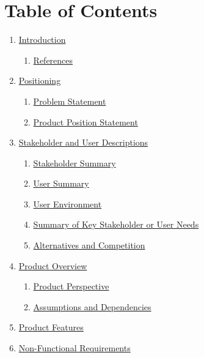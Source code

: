 \documentclass[12pt]{article}
\begin{document}
\section*{Table of Contents}
\par\medskip
\begin{enumerate}
\item \hyperlink{sec:1-introduction}{Introduction}
\par
\begin{enumerate}
\item \hyperlink{sec:11-references}{References}
\par
\end{enumerate}
\item \hyperlink{sec:2-positioning}{Positioning}
\par
\begin{enumerate}
\item \hyperlink{sec:21-problem-statement}{Problem Statement}
\par
\item \hyperlink{sec:22-product-position-statement}{Product Position Statement}
\par
\end{enumerate}
\item \hyperlink{sec:3-stakeholder-and-user-descriptions}{Stakeholder and User Descriptions}
\par
\begin{enumerate}
\item \hyperlink{sec:31-stakeholder-summary}{Stakeholder Summary}
\par
\item \hyperlink{sec:32-user-summary}{User Summary}
\par
\item \hyperlink{sec:33-user-environment}{User Environment}
\par
\item \hyperlink{sec:34-summary-of-key-stakeholder-or-user-needs}{Summary of Key Stakeholder or User Needs}
\par
\item \hyperlink{sec:35-alternatives-and-competition}{Alternatives and Competition}
\par
\end{enumerate}
\item \hyperlink{sec:4-product-overview}{Product Overview}
\par
\begin{enumerate}
\item \hyperlink{sec:41-product-perspective}{Product Perspective}
\par
\item \hyperlink{sec:42-assumptions-and-dependencies}{Assumptions and Dependencies}
\par
\end{enumerate}
\item \hyperlink{sec:5-product-features}{Product Features}
\par
\item \hyperlink{sec:6-non-functional-requirements}{Non-Functional Requirements}
\par
\end{enumerate}
\end{document}
